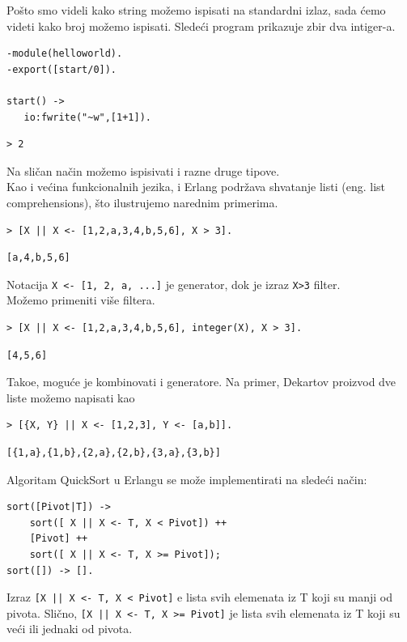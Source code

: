 \documentclass[a4paper]{article}
\begin{document}
{Po\v sto smo videli kako string mo\v zemo ispisati na standardni izlaz, sada \' cemo videti kako broj mo\v zemo ispisati. Slede\' ci program prikazuje zbir dva intiger-a.

\begin{verbatim}
-module(helloworld).
-export([start/0]).

start() ->
   io:fwrite("~w",[1+1]).
\end{verbatim}
\begin{verbatim}
> 2
\end{verbatim}

Na sli\v can na\v cin mo\v zemo ispisivati i razne druge tipove.\\

Kao i ve\' cina funkcionalnih jezika, i Erlang podr\v zava shvatanje listi (eng. list comprehensions), \v sto ilustrujemo narednim primerima.
\begin{verbatim}
> [X || X <- [1,2,a,3,4,b,5,6], X > 3].
\end{verbatim}
\begin{verbatim}
[a,4,b,5,6]
\end{verbatim}
Notacija {\texttt{X <- [1, 2, a, ...]}} je generator, dok je izraz {\texttt{X>3}} filter.\\

Mo\v zemo primeniti vi\v se filtera.
\begin{verbatim}
> [X || X <- [1,2,a,3,4,b,5,6], integer(X), X > 3].
\end{verbatim}
\begin{verbatim}
[4,5,6]
\end{verbatim}

Tako\dj e, mogu\' ce je kombinovati i generatore. Na primer, Dekartov proizvod dve liste mo\v zemo napisati kao
\begin{verbatim}
> [{X, Y} || X <- [1,2,3], Y <- [a,b]].
\end{verbatim}
\begin{verbatim}
[{1,a},{1,b},{2,a},{2,b},{3,a},{3,b}]
\end{verbatim}

Algoritam QuickSort u Erlangu se mo\v ze implementirati na slede\' ci na\v cin:
\begin{verbatim}
sort([Pivot|T]) ->
    sort([ X || X <- T, X < Pivot]) ++
    [Pivot] ++
    sort([ X || X <- T, X >= Pivot]);
sort([]) -> [].
\end{verbatim}
Izraz {\texttt{[X || X <- T, X < Pivot]}} e lista svih elemenata iz T koji su manji od pivota. Sli\v cno, {\texttt{[X || X <- T, X >= Pivot]}} je lista svih elemenata iz T koji su ve\' ci ili jednaki od pivota.\\

}
\end{document}
